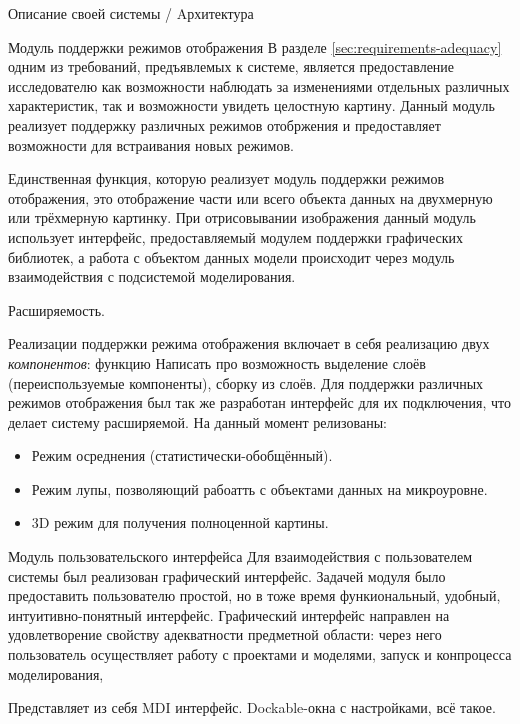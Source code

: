 \documentclass[a4paper,12pt]{extarticle}
\begin{document}
\begin{section}{Описание своей системы / Aрхитектура}
\begin{subsection}{Модуль поддержки режимов отображения}
    В разделе \ref{sec:requirements-adequacy} одним из требований, предъявлемых к системе, является предоставление исследователю как возможности наблюдать за изменениями отдельных различных характеристик, так и возможности увидеть целостную картину. Данный модуль реализует поддержку различных режимов отобржения и предоставляет возможности для встраивания новых режимов.

    Единственная функция, которую реализует модуль поддержки режимов отображения, это отображение части или всего объекта данных на двухмерную или трёхмерную картинку. При отрисовывании изображения данный модуль использует интерфейс, предоставляемый модулем поддержки графических библиотек, а работа с объектом данных модели происходит через модуль взаимодействия с подсистемой моделирования. 

    Расширяемость.

    Реализации поддержки режима отображения включает в себя реализацию двух \textit{компонентов}: функцию
    Написать про возможность выделение слоёв (переиспользуемые компоненты), сборку из слоёв.
    Для поддержки различных режимов отображения был так же разработан интерфейс для их подключения, что делает систему расширяемой. На данный момент релизованы:
    \begin{itemize}
        \item Режим осреднения (статистически-обобщённый).
        \item Режим лупы, позволяющий рабоатть с объектами данных на микроуровне.
        \item 3D режим для получения полноценной картины.
    \end{itemize}
\end{subsection}

\begin{subsection}{Модуль пользовательского интерфейса}
    Для взаимодействия с пользователем системы был реализован графический интерфейс. Задачей модуля было предоставить пользователю простой, но в тоже время функиональный, удобный, интуитивно-понятный интерфейс. Графический интерфейс направлен на удовлетворение свойству адекватности предметной области: через него пользователь осуществляет работу с проектами и моделями, запуск и конпроцесса моделирования, 
    
    Представляет из себя MDI интерфейс. Dockable-окна с настройками, всё такое.
\end{subsection}

\end{section}
\end{document}
